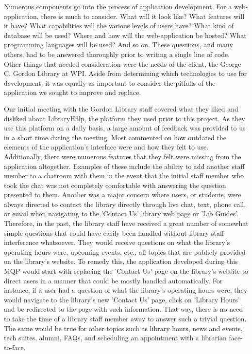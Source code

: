 Numerous components go into the process of application development. For a web-application, there is much to consider. What will it look like? What features will it have? What capabilities will the various levels of users have? What kind of database will be used? Where and how will the web-application be hosted? What programming languages will be used? And so on. These questions, and many others, had to be answered thoroughly prior to writing a single line of code. Other things that needed consideration were the needs of the client, the George C. Gordon Library at WPI. Aside from determining which technologies to use for development, it was equally as important to consider the pitfalls of the application we sought to improve and replace.

Our initial meeting with the Gordon Library staff covered what they liked and disliked about LibraryH3lp, the platform they used prior to this project. As they use this platform on a daily basis, a large amount of feedback was provided to us in a short time during the meeting. Most commented on how outdated the elements of the application's interface were and how they felt to use. Additionally, there were numerous features that they felt were missing from the application altogether. Examples of these include the ability to add another staff member to a chatroom with them in the event that the initial staff member who took the chat was not completely comfortable with answering the question presented to them. Another was a major concern where users, or students, were always directed to contact the library directly through live chat, text, phone call, or email when navigating to the 'Contact Us' library web page or 'Lib Guides'. Therefore, in the past, the library staff have received a great number of somewhat simple questions that could have easily been handled without library staff interference whatsoever. They would receive questions on what the library's operating hours were, upcoming events, etc., all topics that are publicly provided on the library's website. To remedy this, the application developed during this MQP would start with replacing the 'Contact Us' page on the library's website to direct users in a manner that could be mostly handled automatically. For instance, if a user had a question of what the library's operating hours were, they would navigate to the library's new 'Contact Us' page, click on 'Library Hours' and be redirected to the page with such information. That way, there is no need to take the time of a library staff member away to answer such a trivial question. The same would be true for other topics such as library hours, news and events, tech suites, alumni, FAQs, and scheduling an appointment with a librarian face-to-face.

